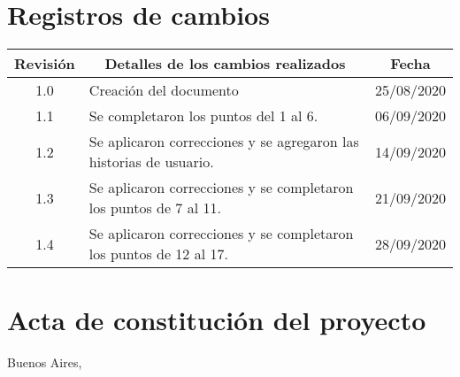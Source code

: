 \documentclass[11pt]{charter}
\begin{document}
\maketitle
\thispagestyle{empty}
\pagebreak


\thispagestyle{empty}
{\setlength{\parskip}{0pt}
\tableofcontents{}
}
\pagebreak


\section{Registros de cambios}
\label{sec:registro}


\begin{table}[ht]
\label{tab:registro}
\centering
\begin{tabularx}{\linewidth}{@{}|c|X|c|@{}}
\hline
\rowcolor[HTML]{C0C0C0} 
Revisión & \multicolumn{1}{c|}{\cellcolor[HTML]{C0C0C0}Detalles de los cambios realizados} & Fecha      \\ \hline
1.0      & Creación del documento                                          & 25/08/2020 \\ \hline
1.1      & Se completaron los puntos del 1 al 6.                                                                 & 06/09/2020 \\ \hline
1.2      & Se aplicaron correcciones y se agregaron las historias de usuario. & 14/09/2020 \\ \hline
1.3      & Se aplicaron correcciones y se completaron los puntos de 7 al 11.                                                 & 21/09/2020 \\ \hline
1.4      & Se aplicaron correcciones y se completaron los puntos de 12 al 17.                                                 & 28/09/2020 \\ \hline
\end{tabularx}
\end{table}

\pagebreak



\section{Acta de constitución del proyecto}
\label{sec:acta}

\begin{flushright}
Buenos Aires, \fechaInicioName
\end{flushright}

\vspace{2cm}
\end{document}
